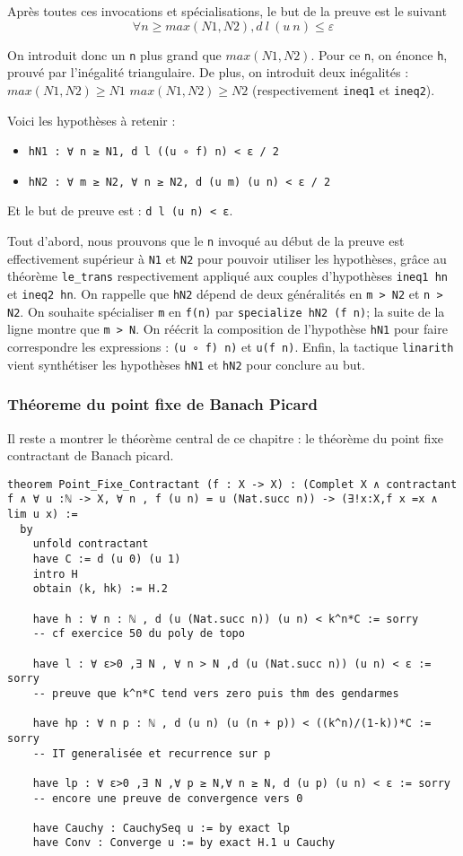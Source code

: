 \documentclass[a4paper, 12pt]{article}
\newcommand{\lean}[1]{\texttt{#1}}
\begin{document}
Après toutes ces invocations et spécialisations, le but de la preuve est le suivant $$\forall n \geq max (N1,N2), d\ l\ (u\ n) \leq \varepsilon$$

On introduit donc un \lean{n} plus grand que $max(N1,N2)$. Pour ce \lean{n}, on énonce \lean{h}, prouvé par l'inégalité triangulaire.
De plus, on introduit deux inégalités : $max(N1,N2) \geq N1$ $max(N1,N2) \geq N2$ (respectivement \lean{ineq1} et \lean{ineq2}).

Voici les hypothèses à retenir :
\begin{itemize}
    \item \lean{hN1 : ∀ n ≥ N1, d l ((u ∘ f) n) < ε / 2}
    \item \lean{hN2 : ∀ m ≥ N2, ∀ n ≥ N2, d (u m) (u n) < ε / 2}
\end{itemize}

Et le but de preuve est : \lean{d l (u n) < ε}.

Tout d'abord, nous prouvons que le \lean{n} invoqué au début de la preuve est effectivement supérieur à \lean{N1} et \lean{N2} pour pouvoir utiliser les hypothèses, grâce au théorème \lean{le_trans} respectivement appliqué aux couples d'hypothèses \lean{ineq1 hn} et \lean{ineq2 hn}. On rappelle que \lean{hN2} dépend de deux généralités en \lean{m > N2} et \lean{n > N2}. On souhaite spécialiser \lean{m} en \lean{f(n)} par \lean{specialize hN2 (f n)}; la suite de la ligne montre que \lean{m > N}.
On réécrit la composition de l'hypothèse \lean{hN1} pour faire correspondre les expressions : \lean{(u ∘ f) n)} et \lean{u(f n)}. Enfin, la tactique \lean{linarith} vient synthétiser les hypothèses \lean{hN1} et \lean{hN2} pour conclure au but.


\subsubsection{Théoreme du point fixe de Banach Picard}

Il reste a montrer le théorème central de ce chapitre : le théorème du point fixe contractant de Banach picard.

\begin{verbatim}
theorem Point_Fixe_Contractant (f : X -> X) : (Complet X ∧ contractant f ∧ ∀ u :ℕ -> X, ∀ n , f (u n) = u (Nat.succ n)) -> (∃!x:X,f x =x ∧ lim u x) :=
  by
    unfold contractant
    have C := d (u 0) (u 1)
    intro H
    obtain ⟨k, hk⟩ := H.2

    have h : ∀ n : ℕ , d (u (Nat.succ n)) (u n) < k^n*C := sorry
    -- cf exercice 50 du poly de topo

    have l : ∀ ε>0 ,∃ N , ∀ n > N ,d (u (Nat.succ n)) (u n) < ε := sorry
    -- preuve que k^n*C tend vers zero puis thm des gendarmes

    have hp : ∀ n p : ℕ , d (u n) (u (n + p)) < ((k^n)/(1-k))*C := sorry
    -- IT generalisée et recurrence sur p

    have lp : ∀ ε>0 ,∃ N ,∀ p ≥ N,∀ n ≥ N, d (u p) (u n) < ε := sorry
    -- encore une preuve de convergence vers 0

    have Cauchy : CauchySeq u := by exact lp
    have Conv : Converge u := by exact H.1 u Cauchy
\end{verbatim}
\end{document}
